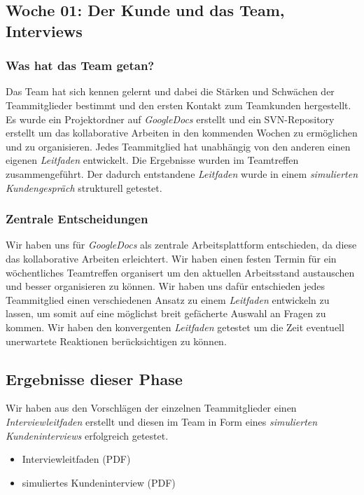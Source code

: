 \documentclass{article}
\begin{document}
\subsection{Woche 01: Der Kunde und das Team, Interviews}

\subsubsection{Was hat das Team getan?}

Das Team hat sich kennen gelernt und dabei die St\"arken und Schw\"achen der Teammitglieder bestimmt und den ersten Kontakt zum Teamkunden hergestellt. Es wurde ein Projektordner auf \textit{GoogleDocs} erstellt und ein SVN-Repository erstellt um das kollaborative Arbeiten in den kommenden Wochen zu erm\"oglichen und zu organisieren. Jedes Teammitglied hat unabh\"angig von den anderen einen eigenen \textit{Leitfaden} entwickelt. Die Ergebnisse wurden im Teamtreffen zusammengef\"uhrt. Der dadurch entstandene \textit{Leitfaden} wurde in einem \textit{simulierten Kundengespr\"ach} strukturell getestet.

\subsubsection{Zentrale Entscheidungen}

Wir haben uns f\"ur \textit{GoogleDocs} als zentrale Arbeitsplattform entschieden, da diese das kollaborative Arbeiten erleichtert. Wir haben einen festen Termin f\"ur ein w\"ochentliches Teamtreffen organisert um den aktuellen Arbeitsstand austauschen und besser organisieren zu k\"onnen. Wir haben uns daf\"ur entschieden jedes Teammitglied einen verschiedenen Ansatz zu einem \textit{Leitfaden} entwickeln zu lassen, um somit auf eine m\"oglichst breit gef\"acherte Auswahl an Fragen zu kommen. Wir haben den konvergenten \textit{Leitfaden} getestet um die Zeit eventuell unerwartete Reaktionen ber\"ucksichtigen zu k\"onnen.

\subsection{Ergebnisse dieser Phase}

Wir haben aus den Vorschl\"agen der einzelnen Teammitglieder einen \textit{Interviewleitfaden} erstellt und diesen im Team in Form eines \textit{simulierten Kundeninterviews} erfolgreich getestet.

\begin{itemize}
\item Interviewleitfaden (PDF)
\item simuliertes Kundeninterview (PDF)
\end{itemize}
\end{document}
